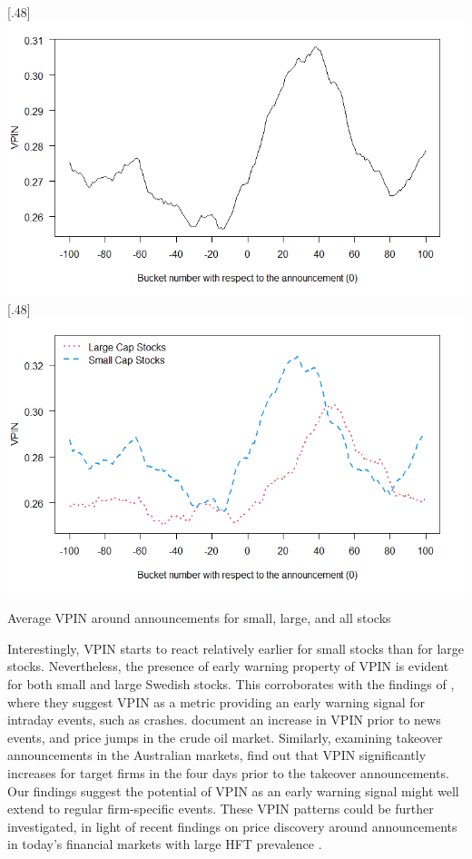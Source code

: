 \begin{widefigure}[H]
    \centering
[.48\textwidth]{\includegraphics[width=\linewidth]{images/app2-bucket_announcement_pl1.png}}%
[.48\textwidth]{\includegraphics[width=\linewidth]{images/app2-bucket_announcement_pl2.png}}
\caption{Average VPIN around announcements for small, large, and all stocks}
\label{tab:vpin_values_around_announcements}
\end{widefigure}


Interestingly, VPIN starts to react relatively earlier for small stocks than for large stocks. Nevertheless, the presence of early warning property of VPIN is evident for both small and large Swedish stocks. This corroborates with the findings of \cite{Easley2011microstructure, Easley2012Flow}, where they suggest VPIN as a metric providing an early warning signal for intraday events, such as crashes. \cite{Bjursell2017VPIN}  document an increase in VPIN prior to news events, and price jumps in the crude oil market. Similarly, \cite{Bugeja2015microstructure} examining takeover announcements in the Australian markets, find out that VPIN significantly increases for target firms in the four days prior to the takeover announcements.
Our findings suggest the potential of VPIN as an early warning signal might well extend to regular firm-specific events. These VPIN patterns could be further investigated, in light of recent findings on price discovery around announcements in today's financial markets with large HFT prevalence \citep{beschwitz2020first, Ersan2021speed}. 


